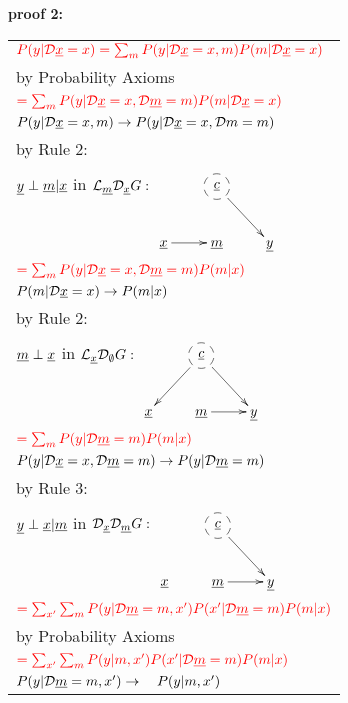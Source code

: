 {\bf * proof 2:}
\begin{longtable}{l}
$\color{red}
P(y|{\cal D}{\underline{x}}=x)=
\sum_m
P(y|{\cal D}{\underline{x}}=x, m)
P(m|{\cal D}{\underline{x}}=x)$
\\
\quad by Probability Axioms
\\
$\color{red}=
\sum_m
P(y|{\cal D}{\underline{x}}=x, {\cal D}{\underline{m}}=m)
P(m|{\cal D}{\underline{x}}=x)$
\\
\quad $P(y|{\cal D}{\underline{x}}=x, m)\rightarrow
P(y|{\cal D}{\underline{x}}=x, {\cal D} m=m)$
\\
\quad by Rule 2:
\begin{tabular}{l}
\\
\end{tabular}
\\
\quad ${\underline{y}}\perp {\underline{m}}|{\underline{x}}$ in
${\cal L}_{\underline{m}}{\cal D}_{\underline{x}} G:$
$\xymatrix{
&*++[F-o]{\rvc}\ar[rd]
\\
\rvx\ar[r]
&\rvm
&\rvy
}$
\\
$\color{red}=
\sum_m
P(y|{\cal D}{\underline{x}}=x, {\cal D}{\underline{m}}=m)
P(m| x)$
\\
\quad $P(m|{\cal D}{\underline{x}}=x)\rightarrow P(m|x)$
\\
\quad by Rule 2:
\begin{tabular}{l}
\\
\end{tabular}
\\
\quad
${\underline{m}}\perp {\underline{x}}$ in
${\cal L}_{\underline{x}}{\cal D}_\emptyset G:$
$\xymatrix{
&*++[F-o]{\rvc}\ar[ld]\ar[rd]
\\
\rvx
&\rvm\ar[r]
&\rvy
}$
\\
$\color{red}=
\sum_m
P(y|{\cal D}{\underline{m}}=m)
P(m|x)$
\\
\quad $P(y|{\cal D}{\underline{x}}=x, {\cal D}{\underline{m}}=m)
\rightarrow
 P(y|{\cal D}{\underline{m}}=m)$
\\
\quad by Rule 3:
\begin{tabular}{l}
\\
\end{tabular}
\\
\quad
${\underline{y}}\perp{\underline{x}}|{\underline{m}}$ in
${\cal D}_{\underline{x}}{\cal D}_{\underline{m}} G:$
$\xymatrix{
&*++[F-o]{\rvc}\ar[rd]
\\
\rvx
&\rvm\ar[r]
&\rvy
}$
\\
$\color{red}=
\sum_{x'}
\sum_m
P(y|{\cal D}{\underline{m}}=m, x')
P(x'|{\cal D}{\underline{m}}=m)
P(m|x)$
\\
\quad by Probability Axioms
\\
$\color{red}=
\sum_{x'}
\sum_m
P(y|m, x')
P(x'|{\cal D}{\underline{m}}=m)
P(m|x)$
\\
\quad $P(y|{\cal D}{\underline{m}}=m, x')
\rightarrow
\quad P(y|m, x')$
\\

\end{longtable}
